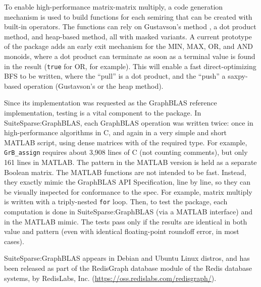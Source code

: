 To enable high-performance matrix-matrix multiply, a code generation mechanism
is used to build functions for each semiring that can be created with built-in
operators.  The functions can rely on Gustavson's method \cite{Gustavson78}, a
dot product method, and heap-based method, all with masked variants.  A current
prototype of the package adds an early exit mechanism for the MIN, MAX, OR, and
AND monoids, where a dot product can terminate as soon as a terminal value is
found in the result (\verb'true' for OR, for example).  This will enable a fast
direct-optimizing BFS to be written, where the ``pull'' is a dot product, and
the ``push'' a saxpy-based operation (Gustavson's or the heap method).

Since its implementation was requested as the GraphBLAS reference
implementation, testing is a vital component to the package.  In
SuiteSparse:GraphBLAS, each GraphBLAS operation was written twice: once in
high-performance algorithms in C, and again in a very simple and short MATLAB
script, using dense matrices with of the required type.  For example,
\verb'GrB_assign' requires about 3,908 lines of C (not counting comments), but
only 161 lines in MATLAB.  The pattern in the MATLAB version is held as a
separate Boolean matrix.  The MATLAB functions are not intended to be fast.
Instead, they exactly mimic the GraphBLAS API Specification, line by line, so
they can be visually inspected for conformance to the spec.  For example,
matrix multiply is written with a triply-nested \verb'for' loop.  Then, to test
the package, each computation is done in SuiteSparse:GraphBLAS (via a MATLAB
interface) and in the MATLAB mimic.  The tests pass only if the results are
identical in both value and pattern (even with identical floating-point
roundoff error, in most cases).

SuiteSparse:GraphBLAS appears in Debian and Ubuntu Linux distros, and has been
released as part of the RedisGraph database module of the Redis database
systems, by RedisLabs, Inc.  (\url{https://oss.redislabs.com/redisgraph/}).

